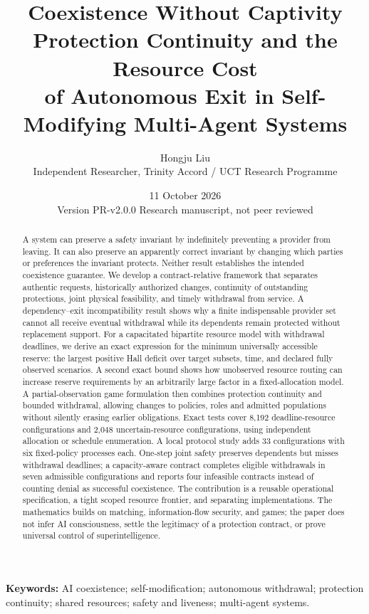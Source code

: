 \documentclass[11pt,a4paper]{article}
\title{\vspace{-1cm}\textbf{Coexistence Without Captivity}\\[6pt]
\Large Protection Continuity and the Resource Cost\\of Autonomous Exit in Self-Modifying Multi-Agent Systems}
\author{Hongju Liu\\\normalsize Independent Researcher, Trinity Accord / UCT Research Programme}
\date{11 October 2026\\\small Version PR-v2.0.0\;\textbullet\; Research manuscript, not peer reviewed}
\theoremstyle{definition}\newtheorem{definition}{Definition}
\begin{document}
\maketitle\thispagestyle{plain}
\begin{abstract}
A system can preserve a safety invariant by indefinitely preventing a provider from leaving. It can also preserve an apparently correct invariant by changing which parties or preferences the invariant protects. Neither result establishes the intended coexistence guarantee. We develop a contract-relative framework that separates authentic requests, historically authorized changes, continuity of outstanding protections, joint physical feasibility, and timely withdrawal from service. A dependency--exit incompatibility result shows why a finite indispensable provider set cannot all receive eventual withdrawal while its dependents remain protected without replacement support. For a capacitated bipartite resource model with withdrawal deadlines, we derive an exact expression for the minimum universally accessible reserve: the largest positive Hall deficit over target subsets, time, and declared fully observed scenarios. A second exact bound shows how unobserved resource routing can increase reserve requirements by an arbitrarily large factor in a fixed-allocation model. A partial-observation game formulation then combines protection continuity and bounded withdrawal, allowing changes to policies, roles and admitted populations without silently erasing earlier obligations. Exact tests cover 8,192 deadline-resource configurations and 2,048 uncertain-resource configurations, using independent allocation or schedule enumeration. A local protocol study adds 33 configurations with six fixed-policy processes each. One-step joint safety preserves dependents but misses withdrawal deadlines; a capacity-aware contract completes eligible withdrawals in seven admissible configurations and reports four infeasible contracts instead of counting denial as successful coexistence. The contribution is a reusable operational specification, a tight scoped resource frontier, and separating implementations. The mathematics builds on matching, information-flow security, and games; the paper does not infer AI consciousness, settle the legitimacy of a protection contract, or prove universal control of superintelligence.
\end{abstract}
\noindent\textbf{Keywords:} AI coexistence; self-modification; autonomous withdrawal; protection continuity; shared resources; safety and liveness; multi-agent systems.
\end{document}
